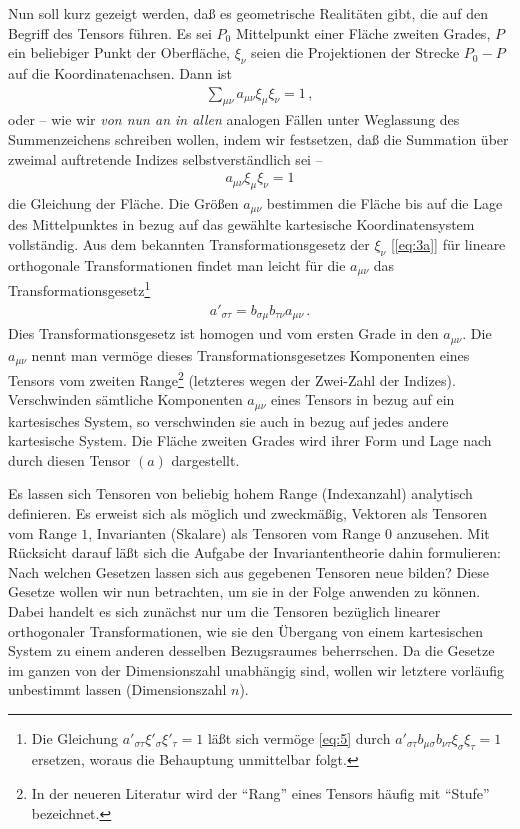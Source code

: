 Nun soll kurz gezeigt werden, daß es geometrische Realitäten gibt, die auf den 
Begriff des Tensors führen. Es sei $P_0$ Mittelpunkt einer Fläche zweiten 
Grades, $P$ ein beliebiger Punkt der Oberfläche, $\xi_{\nu}$ seien die 
Projektionen der Strecke $P_0 - P$ auf die Koordinatenachsen. Dann ist
\begin{align*}
\sum_{\mu\nu} a_{\mu\nu} \xi_{\mu} \xi_{\nu}  = 1\, ,
\end{align*}
oder -- wie wir \emph{von nun an in allen} analogen Fällen unter Weglassung des 
Summenzeichens schreiben wollen, indem wir festsetzen, daß die Summation über 
zweimal auftretende Indizes selbstverständlich sei --
\begin{align*}
a_{\mu\nu} \xi_{\mu} \xi_{\nu}  = 1
\end{align*}
die Gleichung der Fläche. Die Größen $a_{\mu\nu}$ bestimmen die Fläche bis auf 
die Lage des Mittelpunktes in bezug auf das gewählte kartesische 
Koordinatensystem vollständig. Aus dem bekannten Transformationsgesetz der 
$\xi_{\nu}$ [\cref{eq:3a}] für lineare orthogonale Transformationen findet man 
leicht für die $a_{\mu\nu}$ das Transformationsgesetz\footnote{Die Gleichung 
$a'_{\sigma\tau} \xi'_{\sigma} \xi'_{\tau} = 1$ läßt sich vermöge \eqref{eq:5} 
durch $a'_{\sigma\tau} b_{\mu\sigma} b_{\nu\tau} \xi_{\sigma} \xi_{\tau} = 1$ 
ersetzen, woraus die Behauptung unmittelbar folgt.}
\begin{align*}
a'_{\sigma\tau} = b_{\sigma\mu} b_{\tau\nu} a_{\mu\nu}\,.
\end{align*}
Dies Transformationsgesetz ist homogen und vom ersten Grade in den 
$a_{\mu\nu}$. Die $a_{\mu\nu}$ nennt man vermöge dieses Transformationsgesetzes 
Komponenten eines Tensors vom zweiten Range\footnote{In der neueren Literatur 
wird der \enquote{Rang} eines Tensors häufig mit \enquote{Stufe} bezeichnet.} 
(letzteres wegen der Zwei-Zahl der Indizes). Verschwinden sämtliche Komponenten 
$a_{\mu\nu}$ eines Tensors in bezug auf ein kartesisches System, so 
verschwinden sie auch in bezug auf jedes andere kartesische System. Die Fläche 
zweiten Grades wird ihrer Form und Lage nach durch diesen Tensor $(a)$ 
dargestellt.

Es lassen sich Tensoren von beliebig hohem Range (Indexanzahl) analytisch 
definieren. Es erweist sich als möglich und zweckmäßig, Vektoren als Tensoren 
vom Range $1$, Invarianten (Skalare) als Tensoren vom Range $0$ anzusehen. Mit 
Rücksicht darauf läßt sich die Aufgabe der Invariantentheorie dahin 
formulieren: Nach welchen Gesetzen lassen sich aus gegebenen Tensoren neue 
bilden? Diese Gesetze wollen wir nun betrachten, um sie in der Folge anwenden zu 
können. Dabei handelt es sich zunächst nur um die Tensoren bezüglich linearer 
orthogonaler Transformationen, wie sie den Übergang von einem kartesischen 
System zu einem anderen desselben Bezugsraumes beherrschen. Da die Gesetze im 
ganzen von der Dimensionszahl unabhängig sind, wollen wir letztere vorläufig 
unbestimmt lassen (Dimensionszahl $n$).

